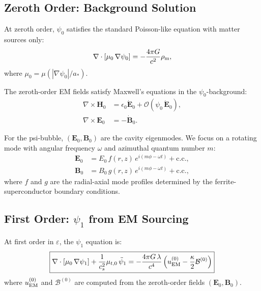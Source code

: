 \documentclass[aps,prd,twocolumn,superscriptaddress,floatfix,nofootinbib]{revtex4-2}
\newcommand{\astar}{a_*}
\newcommand{\mufunction}{\mu}
\newcommand{\lam}{\lambda}
\newcommand{\kap}{\kappa}
\newcommand{\calB}{\mathcal{B}}
\newcommand{\order}[1]{\mathcal{O}\!\left(#1\right)}
\begin{document}
\subsection{Zeroth Order: Background Solution}

At zeroth order, $\psi_0$ satisfies the standard Poisson-like equation
with matter sources only:
\begin{equation}
\nabla\cdot[\mufunction_0\,\nabla\psi_0]
= -\frac{4\pi G}{c^2}\rho_{\rm m},
\label{eq:zeroth-psi}
\end{equation}
where $\mufunction_0 = \mufunction(|\nabla\psi_0|/\astar)$.

The zeroth-order EM fields satisfy Maxwell's equations in the
$\psi_0$-background:
\begin{align}
\nabla\times\mathbf{H}_0 &= \epsilon_0\dot{\mathbf{E}}_0
+ \order{\psi_0\,\dot{\mathbf{E}}_0}, \label{eq:zeroth-maxwell1}\\
\nabla\times\mathbf{E}_0 &= -\dot{\mathbf{B}}_0.
\label{eq:zeroth-maxwell2}
\end{align}

For the psi-bubble, $(\mathbf{E}_0, \mathbf{B}_0)$ are the cavity
eigenmodes. We focus on a rotating mode with angular frequency $\omega$
and azimuthal quantum number $m$:
\begin{align}
\mathbf{E}_0 &= E_0\,f(r,z)\,e^{i(m\phi - \omega t)} + \text{c.c.},
\label{eq:rotating-E}\\
\mathbf{B}_0 &= B_0\,g(r,z)\,e^{i(m\phi - \omega t)} + \text{c.c.},
\label{eq:rotating-B}
\end{align}
where $f$ and $g$ are the radial-axial mode profiles determined by the
ferrite-superconductor boundary conditions.

\subsection{First Order: $\psi_1$ from EM Sourcing}\label{sec:psi1}

At first order in $\varepsilon$, the $\psi_1$ equation is:
\begin{equation}
\boxed{
\nabla\cdot[\mufunction_0\,\nabla\psi_1]
+ \frac{1}{c_s^2}\mufunction_{t,0}\,\ddot\psi_1
= -\frac{4\pi G\,\lam}{c^4}
\left(u_{\rm EM}^{(0)} - \frac{\kap}{2}\calB^{(0)}\right)
}
\label{eq:first-order-psi}
\end{equation}
where $u_{\rm EM}^{(0)}$ and $\calB^{(0)}$ are computed from the
zeroth-order fields $(\mathbf{E}_0,\mathbf{B}_0)$.
\end{document}
